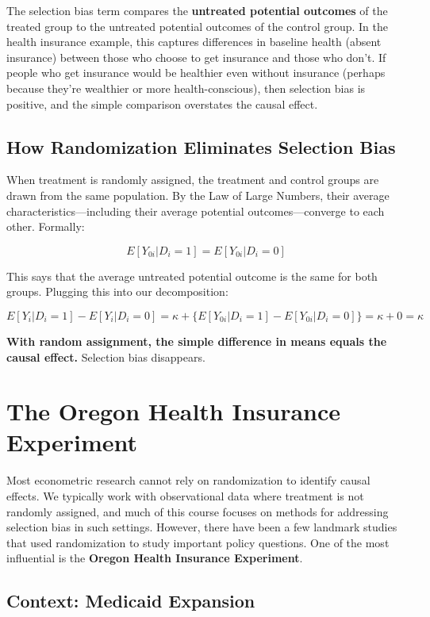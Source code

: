 \documentclass[
  letterpaper,
  DIV=11,
  numbers=noendperiod]{scrreprt}
\begin{document}
The selection bias term compares the \textbf{untreated potential
outcomes} of the treated group to the untreated potential outcomes of
the control group. In the health insurance example, this captures
differences in baseline health (absent insurance) between those who
choose to get insurance and those who don't. If people who get insurance
would be healthier even without insurance (perhaps because they're
wealthier or more health-conscious), then selection bias is positive,
and the simple comparison overstates the causal effect.

\subsection{How Randomization Eliminates Selection
Bias}\label{how-randomization-eliminates-selection-bias}

When treatment is randomly assigned, the treatment and control groups
are drawn from the same population. By the Law of Large Numbers, their
average characteristics---including their average potential
outcomes---converge to each other. Formally:

\[
E[Y_{0i} | D_i = 1] = E[Y_{0i} | D_i = 0]
\]

This says that the average untreated potential outcome is the same for
both groups. Plugging this into our decomposition:

\[
E[Y_i | D_i = 1] - E[Y_i | D_i = 0] = \kappa + \{E[Y_{0i} | D_i = 1] - E[Y_{0i} | D_i = 0]\} = \kappa + 0 = \kappa
\]

\textbf{With random assignment, the simple difference in means equals
the causal effect.} Selection bias disappears.

\section{The Oregon Health Insurance
Experiment}\label{the-oregon-health-insurance-experiment}

Most econometric research cannot rely on randomization to identify
causal effects. We typically work with observational data where
treatment is not randomly assigned, and much of this course focuses on
methods for addressing selection bias in such settings. However, there
have been a few landmark studies that used randomization to study
important policy questions. One of the most influential is the
\textbf{Oregon Health Insurance Experiment}.

\subsection{Context: Medicaid
Expansion}\label{context-medicaid-expansion}
\end{document}
